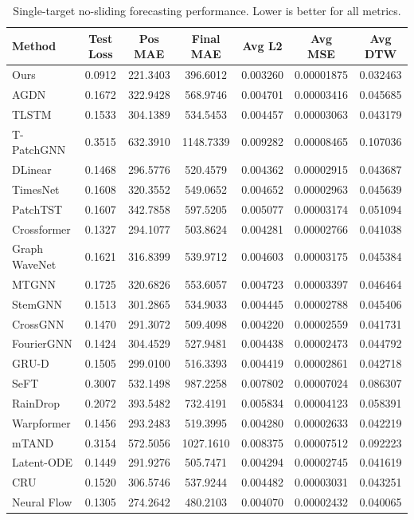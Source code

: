 \begin{table}[t]
    \centering
    \caption{Single-target no-sliding forecasting performance. Lower is better for all metrics.}
    \label{tab:overall-performance-mstd}
    \small
    \begin{tabular}{lcccccc}
        \hline
        Method & Test Loss & Pos MAE & Final MAE & Avg L2 & Avg MSE & Avg DTW \\
        \hline
        Ours & 0.0912 & 221.3403 & 396.6012 & 0.003260 & 0.00001875 & 0.032463 \\
        AGDN & 0.1672 & 322.9428 & 568.9746 & 0.004701 & 0.00003416 & 0.045685 \\
        TLSTM & 0.1533 & 304.1389 & 534.5453 & 0.004457 & 0.00003063 & 0.043179 \\
        T-PatchGNN & 0.3515 & 632.3910 & 1148.7339 & 0.009282 & 0.00008465 & 0.107036 \\
        DLinear & 0.1468 & 296.5776 & 520.4579 & 0.004362 & 0.00002915 & 0.043687 \\
        TimesNet & 0.1608 & 320.3552 & 549.0652 & 0.004652 & 0.00002963 & 0.045639 \\
        PatchTST & 0.1607 & 342.7858 & 597.5205 & 0.005077 & 0.00003174 & 0.051094 \\
        Crossformer & 0.1327 & 294.1077 & 503.8624 & 0.004281 & 0.00002766 & 0.041038 \\
        Graph WaveNet & 0.1621 & 316.8399 & 539.9712 & 0.004603 & 0.00003175 & 0.045384 \\
        MTGNN & 0.1725 & 320.6826 & 553.6057 & 0.004723 & 0.00003397 & 0.046464 \\
        StemGNN & 0.1513 & 301.2865 & 534.9033 & 0.004445 & 0.00002788 & 0.045406 \\
        CrossGNN & 0.1470 & 291.3072 & 509.4098 & 0.004220 & 0.00002559 & 0.041731 \\
        FourierGNN & 0.1424 & 304.4529 & 527.9481 & 0.004438 & 0.00002473 & 0.044792 \\
        GRU-D & 0.1505 & 299.0100 & 516.3393 & 0.004419 & 0.00002861 & 0.042718 \\
        SeFT & 0.3007 & 532.1498 & 987.2258 & 0.007802 & 0.00007024 & 0.086307 \\
        RainDrop & 0.2072 & 393.5482 & 732.4191 & 0.005834 & 0.00004123 & 0.058391 \\
        Warpformer & 0.1456 & 293.2483 & 519.3995 & 0.004280 & 0.00002633 & 0.042219 \\
        mTAND & 0.3154 & 572.5056 & 1027.1610 & 0.008375 & 0.00007512 & 0.092223 \\
        Latent-ODE & 0.1449 & 291.9276 & 505.7471 & 0.004294 & 0.00002745 & 0.041619 \\
        CRU & 0.1520 & 306.5746 & 537.9244 & 0.004482 & 0.00003031 & 0.043251 \\
        Neural Flow & 0.1305 & 274.2642 & 480.2103 & 0.004070 & 0.00002432 & 0.040065 \\
        \hline
    \end{tabular}
\end{table}

